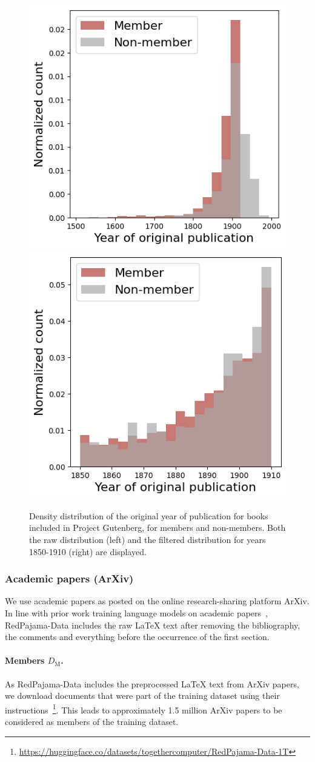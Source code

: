 \documentclass[twocolumn,10pt]{article}
\begin{document}
\begin{figure}[!ht]
\centering
\includegraphics[width=0.49\linewidth]{figures/book_dates_original.png} 
\includegraphics[width=0.49\linewidth]{figures/book_dates_filtered.png} 
    \caption{Density distribution of the original year of publication for books included in Project Gutenberg, for members and non-members. Both the raw distribution (left) and the filtered distribution for years 1850-1910 (right) are displayed.} 
\label{fig:book_dates}
\end{figure}

\subsubsection{Academic papers (ArXiv)}

We use academic papers as posted on the online research-sharing platform ArXiv. In line with prior work training language models on academic papers~\cite{lewkowycz2022solving}, RedPajama-Data includes the raw LaTeX text after removing the bibliography, the comments and everything before the occurrence of the first section. 

\paragraph{\textbf{Members $D_{\text{M}}$.}} As RedPajama-Data includes the preprocessed LaTeX text from ArXiv papers, we download documents that were part of the training dataset using their instructions~\footnote{\url{https://huggingface.co/datasets/togethercomputer/RedPajama-Data-1T}}. This leads to approximately 1.5 million ArXiv papers to be considered as members of the training dataset.
\end{document}
